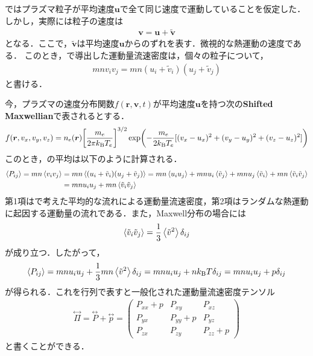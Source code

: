 \documentclass{report}
\begin{document}
\label{chap:appendix}
ではプラズマ粒子が平均速度$\bm{u}$で全て同じ速度で運動していることを仮定した．しかし，実際には粒子の速度は
\begin{align}
  \bm{v} = \bm{u} + \tilde{\bm{v}}
\end{align}
となる．ここで，$\tilde{\bm{v}}$は平均速度$\bm{u}$からのずれを表す．微視的な熱運動の速度である．
このとき，で導出した運動量流速密度は，個々の粒子について，
\begin{align}
  mnv_i v_j = mn(u_i + \tilde{v}_i)(u_j + \tilde{v}_j) \label{eq:momentum-flux-tilde}
\end{align}
と書ける．

今，プラズマの速度分布関数$f(\bm{r},\bm{v},t)$が平均速度$\bm{u}$を持つ次の\textbf{Shifted Maxwellian}で表されるとする．
\begin{align}
  f(\bm{r},v_x,v_y,v_z) = n_e (\bm{r}) \qty[\frac{m_e}{2\pi k_{\mathrm{B}} T_e}]^{3/2} \exp(-\frac{m_e}{2k_{\mathrm{B}} T_e}[(v_x - u_x)^2 + (v_y - u_y)^2 + (v_z - u_z)^2])
\end{align}
このとき，の平均は以下のように計算される．
\begin{align}
  \ev{P_{ij}} = mn\ev{v_i v_j} &= mn\ev{(u_i + \tilde{v}_i)(u_j + \tilde{v}_j)} = mn\ev{u_i u_j} + mnu_i\ev{\tilde{v}_j} + mnu_j\ev{\tilde{v}_i} + mn\ev{\tilde{v}_i \tilde{v}_j}\\
  &= mnu_iu_j + mn\ev{\tilde{v}_i \tilde{v}_j}
\end{align}
第1項はで考えた平均的な流れによる運動量流速密度，第2項はランダムな熱運動に起因する運動量の流れである．また，Maxwell分布の場合には
\begin{align}
  \ev{\tilde{v}_i \tilde{v}_j} = \frac{1}{3} \ev{\tilde{v}^2} \delta_{ij}
\end{align}
が成り立つ．したがって，
\begin{align}
  \ev{P_{ij}} = mnu_iu_j + \frac{1}{3}mn\ev{\tilde{v}^2} \delta_{ij} = mnu_iu_j + n\kb T \delta_{ij} = mnu_iu_j + p \delta_{ij}
\end{align}
が得られる．これを行列で表すと一般化された運動量流速密度テンソル
\begin{align}
  \overset{\leftrightarrow}{\Pi} = \overset{\leftrightarrow}{P} + \overset{\leftrightarrow}{p} = 
  \begin{pmatrix}
    P_{xx} + p & P_{xy} & P_{xz}\\
    P_{yx} & P_{yy} + p & P_{yz}\\
    P_{zx} & P_{zy} & P_{zz} + p
  \end{pmatrix}
\end{align}
と書くことができる．
\end{document}
